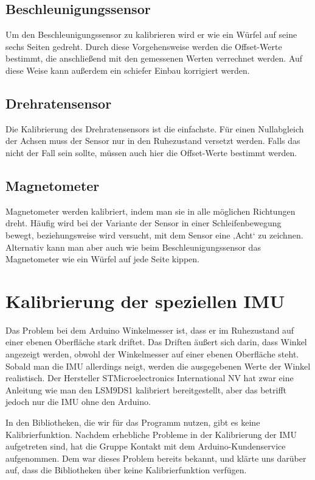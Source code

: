 \subsection{Beschleunigungssensor}

Um den Beschleunigungssensor zu kalibrieren wird er wie ein Würfel auf seine sechs Seiten gedreht. Durch diese Vorgehensweise werden die Offset-Werte bestimmt, die anschließend mit den gemessenen Werten verrechnet werden. Auf diese Weise kann außerdem ein schiefer Einbau korrigiert werden.


\subsection{Drehratensensor}

Die Kalibrierung des Drehratensensors ist die einfachste. Für einen Nullabgleich der Achsen muss der Sensor nur in den Ruhezustand versetzt werden. Falls das nicht der Fall sein sollte, müssen auch hier die Offset-Werte bestimmt werden.


\subsection{Magnetometer}

Magnetometer werden kalibriert, indem man sie in alle möglichen Richtungen dreht. Häufig wird bei der Variante der Sensor in einer Schleifenbewegung bewegt, beziehungsweise wird versucht, mit dem Sensor eine ‚Acht‘ zu zeichnen. Alternativ kann man aber auch wie beim Beschleunigungssensor das Magnetometer wie ein Würfel auf jede Seite kippen. \cite{Weber:2021}

\clearpage


\section{Kalibrierung der speziellen IMU}

Das Problem bei dem Arduino Winkelmesser ist, dass er im Ruhezustand auf einer ebenen Oberfläche stark driftet. Das Driften äußert sich darin, dass Winkel angezeigt werden, obwohl der Winkelmesser auf einer ebenen Oberfläche steht. Sobald man die IMU allerdings neigt, werden die ausgegebenen Werte der Winkel realistisch. Der Hersteller STMicroelectronics International NV hat zwar eine Anleitung wie man den LSM9DS1 kalibriert bereitgestellt, aber das betrifft jedoch nur die IMU ohne den Arduino. \cite{STMicroelectronics:2022}


In den Bibliotheken, die wir für das Programm nutzen, gibt es keine Kalibrierfunktion. Nachdem erhebliche Probleme in der Kalibrierung der IMU aufgetreten sind, hat die Gruppe Kontakt mit dem Arduino-Kundenservice aufgenommen. Dem war dieses Problem bereits bekannt, und klärte uns darüber auf, dass die Bibliotheken über keine Kalibrierfunktion verfügen. \vspace{0.5cm}

